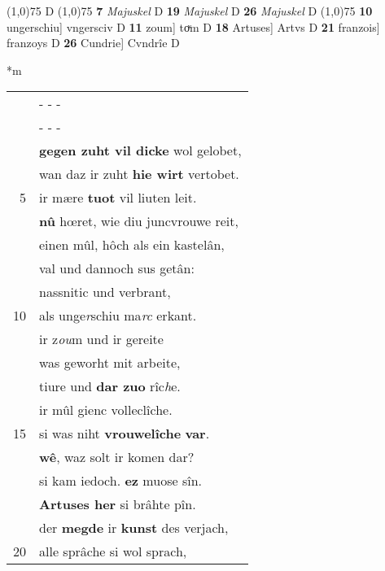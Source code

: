 \documentclass[8pt,a4paper,notitlepage]{article}
\begin{document}
\begin{table}[ht]
\begin{minipage}[t]{0.5\linewidth}
\begin{tabular}{rl}
\end{tabular}
\scriptsize
\line(1,0){75} \newline
D \newline
\line(1,0){75} \newline
\textbf{7} \textit{Majuskel} D  \textbf{19} \textit{Majuskel} D  \textbf{26} \textit{Majuskel} D  \newline
\line(1,0){75} \newline
\textbf{10} ungerschiu] vngersciv D \textbf{11} zoum] toͮm D \textbf{18} Artuses] Artvs D \textbf{21} franzois] franzoys D \textbf{26} Cundrie] Cvndrîe D \newline
\end{minipage}
\hspace{0.5cm}
\begin{minipage}[t]{0.5\linewidth}
\small
\begin{center}*m
\end{center}
\begin{tabular}{rl}
 & \multicolumn{1}{l}{ - - - }\\ 
 & \multicolumn{1}{l}{ - - - }\\ 
 & \textbf{gegen zuht vil dicke} wol gelobet,\\ 
 & wan daz ir zuht \textbf{hie wirt} vertobet.\\ 
5 & ir mære \textbf{tuot} vil liuten leit.\\ 
 & \textbf{nû} hœret, wie diu juncvrouwe reit,\\ 
 & einen mûl, hôch als ein kastelân,\\ 
 & val und dannoch sus getân:\\ 
 & nassnitic und verbrant,\\ 
10 & als unge\textit{r}schiu ma\textit{rc} erkant.\\ 
 & ir z\textit{ou}m und ir gereite\\ 
 & was geworht mit arbeite,\\ 
 & tiure und \textbf{dar zuo} rîc\textit{h}e.\\ 
 & ir mûl gienc volleclîche.\\ 
15 & si was niht \textbf{vrouwelîche} \textbf{var}.\\ 
 & \textbf{wê}, waz solt ir komen dar?\\ 
 & si kam iedoch. \textbf{ez} muose sîn.\\ 
 & \textbf{Artuses her} si brâhte pîn.\\ 
 & der \textbf{megde} ir \textbf{kunst} des verjach,\\ 
20 & alle sprâche si wol sprach,\\ 

\end{tabular}
\end{minipage}
\end{table}
\end{document}
